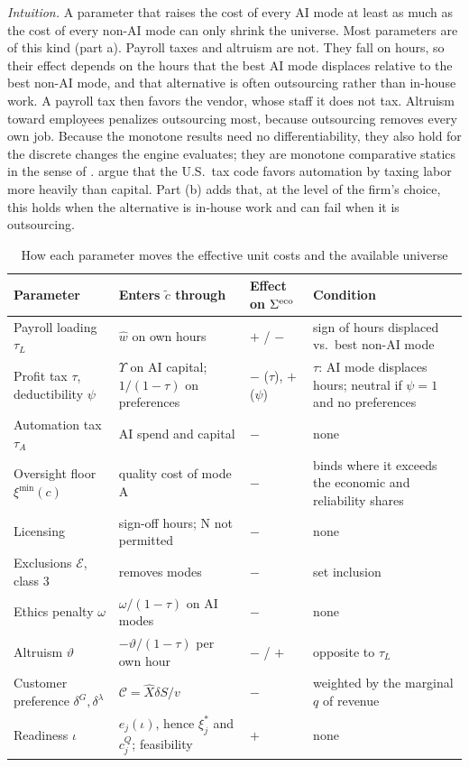 \noindent\emph{Intuition.} A parameter that raises the cost of every AI mode at least as much as the cost of every non-AI mode can only shrink the universe. Most parameters are of this kind (part a). Payroll taxes and altruism are not. They fall on hours, so their effect depends on the hours that the best AI mode displaces relative to the best non-AI mode, and that alternative is often outsourcing rather than in-house work. A payroll tax then favors the vendor, whose staff it does not tax. Altruism toward employees penalizes outsourcing most, because outsourcing removes every own job. Because the monotone results need no differentiability, they also hold for the discrete changes the engine evaluates; they are monotone comparative statics in the sense of \citet{milgrom1994monotone}. \citet{acemoglu2020does} argue that the U.S.\ tax code favors automation by taxing labor more heavily than capital. Part (b) adds that, at the level of the firm's choice, this holds when the alternative is in-house work and can fail when it is outsourcing.

\begin{table}[t]
\centering
\caption{How each parameter moves the effective unit costs and the available universe}\label{tab:ext-statics}
\footnotesize
\setlength{\tabcolsep}{4pt}
\begin{tabular}{@{}p{3.3cm}p{4.3cm}p{1.5cm}p{5.6cm}@{}}
\toprule
Parameter & Enters $\tilde c$ through & Effect on $\Sigma^{\rm eco}$ & Condition\\
\midrule
Payroll loading $\tau_L$ & $\hat w$ on own hours & $+$ / $-$ & sign of hours displaced vs.\ best non-AI mode\\
Profit tax $\tau$, deductibility $\psi$ & $\Upsilon$ on AI capital; $1/(1-\tau)$ on preferences & $-$ ($\tau$), $+$ ($\psi$) & $\tau$: AI mode displaces hours; neutral if $\psi=1$ and no preferences\\
Automation tax $\tau_A$ & AI spend and capital & $-$ & none\\
Oversight floor $\xi^{\min}(c)$ & quality cost of mode A & $-$ & binds where it exceeds the economic and reliability shares\\
Licensing & sign-off hours; N not permitted & $-$ & none\\
Exclusions $\mathcal E$, class 3 & removes modes & $-$ & set inclusion\\
Ethics penalty $\omega$ & $\omega/(1-\tau)$ on AI modes & $-$ & none\\
Altruism $\vartheta$ & $-\vartheta/(1-\tau)$ per own hour & $-$ / $+$ & opposite to $\tau_L$\\
Customer preference $\delta^G,\delta^\lambda$ & $\mathcal C=\hat X\delta S/v$ & $-$ & weighted by the marginal $q$ of revenue\\
Readiness $\iota$ & $e_j(\iota)$, hence $\xi^*_j$ and $c^Q_j$; feasibility & $+$ & none\\
\bottomrule
\end{tabular}
\end{table}

